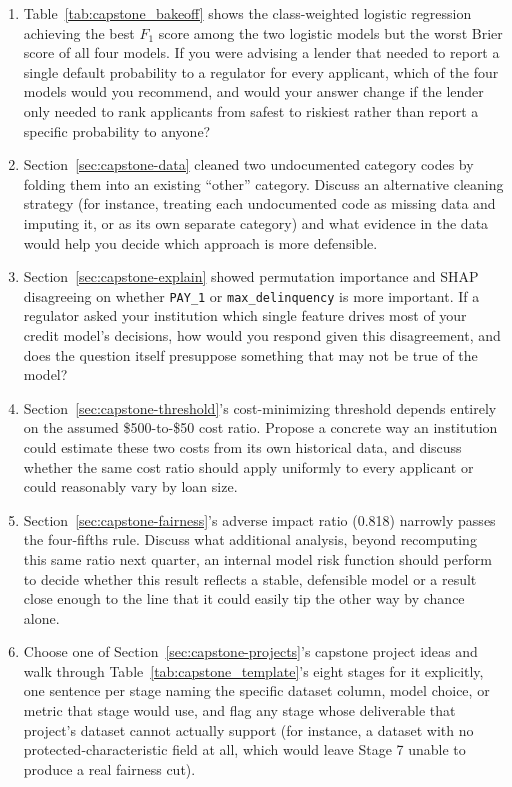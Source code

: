 \documentclass[../ai_in_finance]{subfiles}
\begin{document}
\begin{enumerate}
    \item Table~\ref{tab:capstone_bakeoff} shows the class-weighted logistic regression achieving the best $F_1$ score among the two logistic models but the worst Brier score of all four models. If you were advising a lender that needed to report a single default probability to a regulator for every applicant, which of the four models would you recommend, and would your answer change if the lender only needed to rank applicants from safest to riskiest rather than report a specific probability to anyone?
    \item Section~\ref{sec:capstone-data} cleaned two undocumented category codes by folding them into an existing ``other'' category. Discuss an alternative cleaning strategy (for instance, treating each undocumented code as missing data and imputing it, or as its own separate category) and what evidence in the data would help you decide which approach is more defensible.
    \item Section~\ref{sec:capstone-explain} showed permutation importance and SHAP disagreeing on whether \texttt{PAY\_1} or \texttt{max\_\allowbreak delinquency} is more important. If a regulator asked your institution which single feature drives most of your credit model's decisions, how would you respond given this disagreement, and does the question itself presuppose something that may not be true of the model?
    \item Section~\ref{sec:capstone-threshold}'s cost-minimizing threshold depends entirely on the assumed \$500-to-\$50 cost ratio. Propose a concrete way an institution could estimate these two costs from its own historical data, and discuss whether the same cost ratio should apply uniformly to every applicant or could reasonably vary by loan size.
    \item Section~\ref{sec:capstone-fairness}'s adverse impact ratio (0.818) narrowly passes the four-fifths rule. Discuss what additional analysis, beyond recomputing this same ratio next quarter, an internal model risk function should perform to decide whether this result reflects a stable, defensible model or a result close enough to the line that it could easily tip the other way by chance alone.
    \item Choose one of Section~\ref{sec:capstone-projects}'s capstone project ideas and walk through Table~\ref{tab:capstone_template}'s eight stages for it explicitly, one sentence per stage naming the specific dataset column, model choice, or metric that stage would use, and flag any stage whose deliverable that project's dataset cannot actually support (for instance, a dataset with no protected-characteristic field at all, which would leave Stage 7 unable to produce a real fairness cut).

\end{enumerate}
\end{document}
